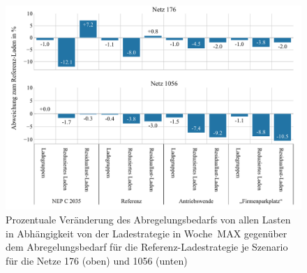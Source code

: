 \begin{figure}[H]
    \centering
    \includegraphics[width=\textwidth]{Bilder/176_1056_cur_load_grid_week_B}
    \caption{Prozentuale Veränderung des Abregelungsbedarfs von allen Lasten in Abhängigkeit von der Ladestrategie in Woche~MAX gegenüber dem Abregelungsbedarf für die Referenz-Ladestrategie je Szenario für die Netze \num{176} (oben) und \num{1056} (unten)}\label{fig:176_1056_cur_load_grid_week_B}
\end{figure}